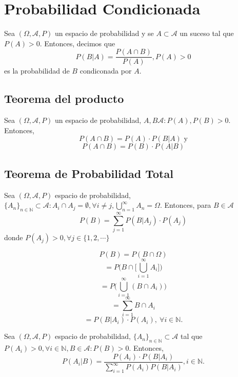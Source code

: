 \section{Probabilidad Condicionada}

\begin{defn}
  Sea $(\Omega, \mathcal{A}, P )$ un espacio de probabilidad y se $ A \subset \mathcal{A}$ un suceso tal que $P(A) > 0$. Entonces, decimos que
  \[ 
     P(B | A) = \frac{P(A \cap B)}{P(A)} , P(A) > 0
  \] 
  es la probabilidad de $B$ condiconada por $A$.
\end{defn}

\subsection{Teorema del producto}

\begin{theo}
  Sea $(\Omega, \mathcal{A}, P )$ un espacio de probabilidad, $A,B \mathcal{A}: P(A), P(B) > 0 $. Entonces,
  \[ 
    P(A \cap B) = P(A) \cdot P(B | A)  \text{ y}
  \] 
  \[ 
    P(A \cap B) = P(B) \cdot P(A | B) 
  \] 
\end{theo}

\subsection{Teorema de Probabilidad Total}

\begin{theo}
  Sea $(\Omega, \mathcal{A}, P )$ espacio de probabilidad, $\{ A_{n} \}_{n \in \mathbb{N}}\subset \mathcal{A}: A_{i} \cap A_{j} = \emptyset, \forall i \neq j, \bigcup_{n = 1}^{\infty} A_{n} = \Omega $. Entonces, para $B \in \mathcal{A}$
  \[ 
    P(B) = \sum_{ j = 1 }^{\infty}  P(B | A_{j})\cdot P(A_{j})
  \] 
  donde $P(A_{j}) > 0, \forall j \in \{ 1, 2, \cdots \}$
\end{theo}

\begin{dem}
  \[
    P(B) = P( B \cap \Omega) 
  \]
  \[
    = P \Big ( B \cap \Big[ \bigcup_{i=1}^{\infty} A_{i} \Big] \Big ) 
  \]
  \[
    = P \Big (\bigcup_{i = 1}^{\infty} (B \cap A_{i}) \Big )
  \]
  \[ 
    = \sum_{i = 1}^{\infty} B \cap A_{i} 
  \] 
  \[ 
    = P(B | A_{i}) \cdot P(A_{i}) , \ \forall i \in \mathbb{N}.
  \] 
\end{dem}

\begin{theo}[de Bayes]
  Sea $(\Omega, \mathcal{A}, P )$ espacio de probabilidad, $\{ A_{n} \}_{n \in \mathbb{N}} \subset \mathcal{A}$ tal que $P(A_{i}) >0, \forall i \in \mathbb{N}, B \in \mathcal{A}: P(B) > 0$. Entonces,
  \[ 
    P(A_{i} | B) = \frac{P(A_{i})\cdot P(B | A_{i})}{\sum_{i = 1}^{\infty} P(A_{i}) P(B | A_{i})}, i \in \mathbb{N}.
  \] 
\end{theo}

